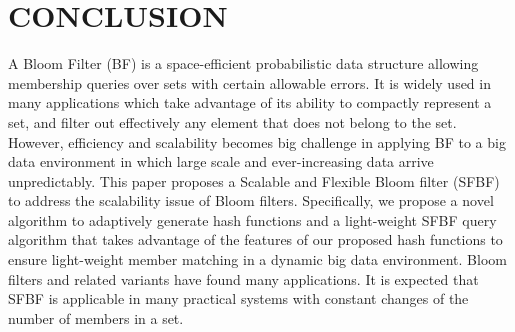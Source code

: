\documentclass[10pt,journal,letterpaper]{IEEEtran}
\newcommand{\note}[1]{{\sffamily\itshape\bfseries\uline{#1}}}
\begin{document}

\section{CONCLUSION}
\label{sec:CONCLUSION}
A Bloom Filter (BF) is a space-efficient probabilistic data structure allowing membership queries over
sets with certain allowable errors. It is widely used in many applications which take advantage of
its ability to compactly represent a set, and filter out effectively any element that does not belong
to the set. However, efficiency and scalability becomes big challenge in applying BF to a big data environment in which large scale and ever-increasing data arrive unpredictably. This paper proposes a  Scalable and Flexible Bloom
filter (SFBF) to address the scalability issue of Bloom filters. Specifically, we propose a novel algorithm to adaptively generate hash functions and a light-weight SFBF query algorithm that takes advantage of the features of our proposed hash functions to ensure light-weight member matching in a dynamic big data environment. Bloom filters and related variants have found many applications. It is expected that SFBF is applicable in many practical systems with constant changes of the number of members in a set.



%
\end{document}
